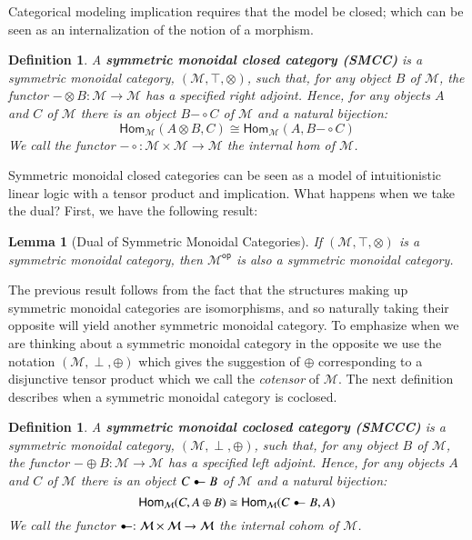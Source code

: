 \documentclass{lmcs}
\newtheorem{lemma}[theorem]{Lemma}
\newtheorem{definition}[theorem]{Definition}
\let\mto\to
\let\to\relax
\newcommand{\to}{\rightarrow}
\newcommand{\cat}[1]{\mathcal{#1}}
\newcommand{\catop}[1]{\cat{#1}^{\mathsf{op}}}
\newcommand{\Hom}[3]{\mathsf{Hom}_{\cat{#1}}(#2,#3)}
\newcommand{\limp}[0]{\multimap}
\newcommand{\colimp}[0]{\multimapdotinv}
\def\limp{\mathrel{-\!\circ}}
\begin{document}
Categorical modeling implication requires that the model be closed;
which can be seen as an internalization of the notion of a morphism.
\begin{definition}
  \label{def:SMCC}
  A \textbf{symmetric monoidal closed category (SMCC)} is a symmetric
  monoidal category, $(\cat{M},\top,\otimes)$, such that, for any object
  $B$ of $\cat{M}$, the functor $- \otimes B : \cat{M} \mto \cat{M}$
  has a specified right adjoint.  Hence, for any objects $A$ and $C$
  of $\cat{M}$ there is an object $B \limp C$ of $\cat{M}$ and a
  natural bijection:
  \[
  \Hom{\cat{M}}{A \otimes B}{C} \cong \Hom{\cat{M}}{A}{B \limp C}
  \]
  We call the functor $\limp : \cat{M} \times \cat{M} \mto \cat{M}$
  the internal hom of $\cat{M}$.
\end{definition}

Symmetric monoidal closed categories can be seen as a model of
intuitionistic linear logic with a tensor product and implication.
What happens when we take the dual?  First, we have the following
result:
\begin{lemma}[Dual of Symmetric Monoidal Categories]
  \label{lemma:dual_of_symmetric_monoidal_categories}
  If $(\cat{M},\top,\otimes)$ is a symmetric monoidal category, then
  $\catop{M}$ is also a symmetric monoidal category.
\end{lemma}
The previous result follows from the fact that the structures making
up symmetric monoidal categories are isomorphisms, and so naturally
taking their opposite will yield another symmetric monoidal category.
To emphasize when we are thinking about a symmetric monoidal category
in the opposite we use the notation $(\cat{M},\perp,\oplus)$ which gives
the suggestion of $\oplus$ corresponding to a disjunctive tensor
product which we call the \textit{cotensor} of $\cat{M}$. The next
definition describes when a symmetric monoidal category is coclosed.
\begin{definition}
  \label{def:SMCCC}
  A \textbf{symmetric monoidal coclosed category (SMCCC)} is a symmetric
  monoidal category, $(\cat{M},\perp,\oplus)$, such that, for any object
  $B$ of $\cat{M}$, the functor $- \oplus B : \cat{M} \mto \cat{M}$
  has a specified left adjoint.  Hence, for any objects $A$ and $C$
  of $\cat{M}$ there is an object $C \colimp B$ of $\cat{M}$ and a
  natural bijection:
  \[
  \Hom{\cat{M}}{C}{A \oplus B} \cong \Hom{\cat{M}}{C \colimp B}{A}
  \]
  We call the functor $\colimp : \cat{M} \times \cat{M} \mto \cat{M}$
  the internal cohom of $\cat{M}$.
\end{definition}
\end{document}
